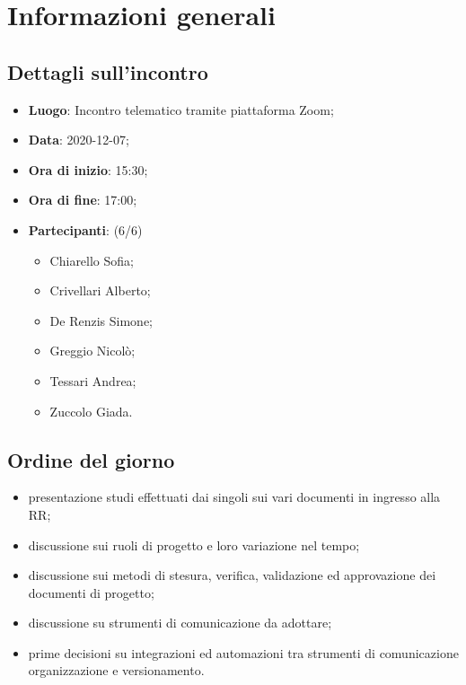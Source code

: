 \section{Informazioni generali}

\subsection{Dettagli sull'incontro}
\begin{itemize}
\item \textbf{Luogo}: Incontro telematico tramite piattaforma Zoom;
\item \textbf{Data}: 2020-12-07;
\item \textbf{Ora di inizio}: 15:30;
\item \textbf{Ora di fine}: 17:00;
\item \textbf{Partecipanti}: (6/6)
\begin{itemize}
	\item Chiarello Sofia;
    \item Crivellari Alberto;
    \item De Renzis Simone;
    \item Greggio Nicolò;
    \item Tessari Andrea;
    \item Zuccolo Giada.
\end{itemize}
\end{itemize}

\subsection{Ordine del giorno}
\begin{itemize}
	\item presentazione studi effettuati dai singoli sui vari documenti in ingresso alla RR;
    \item discussione sui ruoli di progetto e loro variazione nel tempo;
    \item discussione sui metodi di stesura, verifica, validazione ed approvazione dei documenti di progetto;
    \item discussione su strumenti di comunicazione da adottare;
    \item prime decisioni su integrazioni ed automazioni tra strumenti di comunicazione organizzazione e versionamento.
\end{itemize}


